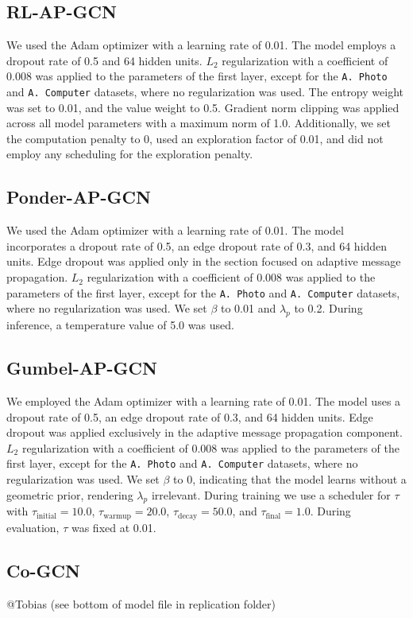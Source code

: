 \documentclass{gdl}
\begin{document}
\subsection{RL-AP-GCN}
\label{lab:hyper-rl-gcn}
We used the Adam optimizer with a learning rate of 0.01. The model employs a dropout rate of 0.5 and 64 hidden units. $L_2$ regularization with a coefficient of 0.008 was applied to the parameters of the first layer, except for the \texttt{A. Photo} and \texttt{A. Computer} datasets, where no regularization was used. The entropy weight was set to 0.01, and the value weight to 0.5. Gradient norm clipping was applied across all model parameters with a maximum norm of 1.0. Additionally, we set the computation penalty to 0, used an exploration factor of 0.01, and did not employ any scheduling for the exploration penalty.

\subsection{Ponder-AP-GCN}
\label{lab:hyper-ponder-gcn}
We used the Adam optimizer with a learning rate of 0.01. The model incorporates a dropout rate of 0.5, an edge dropout rate of 0.3, and 64 hidden units. Edge dropout was applied only in the section focused on adaptive message propagation. $L_2$ regularization with a coefficient of 0.008 was applied to the parameters of the first layer, except for the \texttt{A. Photo} and \texttt{A. Computer} datasets, where no regularization was used. We set $\beta$ to 0.01 and $\lambda_p$ to 0.2. During inference, a temperature value of 5.0 was used.

\subsection{Gumbel-AP-GCN}
\label{lab:hyper-gumbel-gcn}
We employed the Adam optimizer with a learning rate of 0.01. The model uses a dropout rate of 0.5, an edge dropout rate of 0.3, and 64 hidden units. Edge dropout was applied exclusively in the adaptive message propagation component. $L_2$ regularization with a coefficient of 0.008 was applied to the parameters of the first layer, except for the \texttt{A. Photo} and \texttt{A. Computer} datasets, where no regularization was used. We set $\beta$ to 0, indicating that the model learns without a geometric prior, rendering $\lambda_p$ irrelevant. During training we use a scheduler for $\tau$ with $\tau_{\text{initial}} = 10.0$, $\tau_{\text{warmup}} = 20.0$, $\tau_{\text{decay}} = 50.0$, and $\tau_{\text{final}} = 1.0$. During evaluation, $\tau$ was fixed at 0.01.

\subsection{Co-GCN}
\label{lab:hyper-Co-GCN}
@Tobias (see bottom of model file in replication folder)
\end{document}
